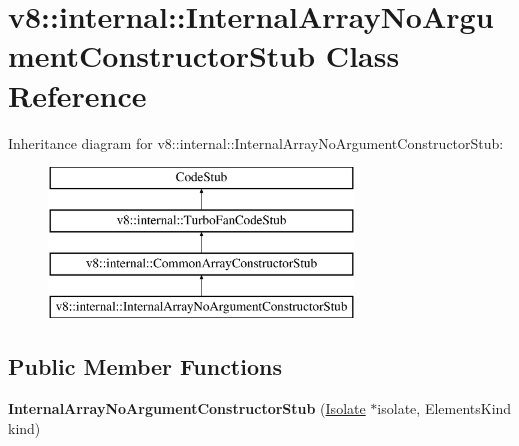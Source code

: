\hypertarget{classv8_1_1internal_1_1_internal_array_no_argument_constructor_stub}{}\section{v8\+:\+:internal\+:\+:Internal\+Array\+No\+Argument\+Constructor\+Stub Class Reference}
\label{classv8_1_1internal_1_1_internal_array_no_argument_constructor_stub}
Inheritance diagram for v8\+:\+:internal\+:\+:Internal\+Array\+No\+Argument\+Constructor\+Stub\+:\begin{figure}[H]
\begin{center}
\leavevmode
\includegraphics[height=4.000000cm]{classv8_1_1internal_1_1_internal_array_no_argument_constructor_stub}
\end{center}
\end{figure}
\subsection*{Public Member Functions}
\begin{DoxyCompactItemize}
\item 
{\bfseries Internal\+Array\+No\+Argument\+Constructor\+Stub} (\hyperlink{classv8_1_1internal_1_1_isolate}{Isolate} $\ast$isolate, Elements\+Kind kind)\hypertarget{classv8_1_1internal_1_1_internal_array_no_argument_constructor_stub_a616841888b251fa41cca1505c9c341da}{}\label{classv8_1_1internal_1_1_internal_array_no_argument_constructor_stub_a616841888b251fa41cca1505c9c341da}

\end{DoxyCompactItemize}
